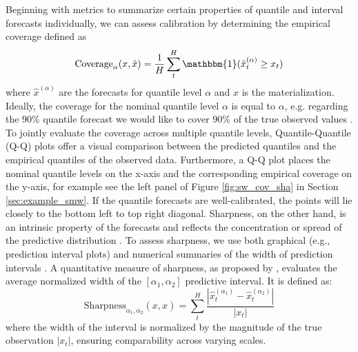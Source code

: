\documentclass[a4paper,oneside,bibliography=totoc]{scrbook}
\begin{document}
\noindent
Beginning with metrics to summarize certain properties of quantile and interval forecasts individually, we can assess calibration by determining the empirical coverage \cite{christoffersen_evaluating_1998, gneiting_probabilistic_2007} defined as 
 \begin{equation}
    \text{Coverage}_\alpha(x,\hat{x}) = \frac{1}{H}\sum_t^H \mathbbm{1}(\hat{x}_t^{(\alpha)} \geq x_t)
    \label{eq:coverage}
\end{equation}
where $\hat{x}^{(\alpha)}$ are the forecasts for quantile level $\alpha$ and $x$ is the materialization.
Ideally, the coverage for the nominal quantile level $\alpha$ is equal to $\alpha$, e.g. regarding the $90\%$ quantile forecast we would like to cover $90\%$ of the true observed values \cite{dheur_large-scale_2023}.
To jointly evaluate the coverage across multiple quantile levels, Quantile-Quantile (Q-Q) plots \cite{wilk_probability_1968, almeida_ggplot2_2018} offer a visual comparison between the predicted quantiles and the empirical quantiles of the observed data. 
Furthermore, a Q-Q plot places the nominal quantile levels on the x-axis and the corresponding empirical coverage on the y-axis, for example see the left panel of Figure \ref{fig:sw_cov_sha} in Section \ref{sec:example_smw}. If the quantile forecasts are well-calibrated, the points will lie closely to the bottom left to top right diagonal.
Sharpness, on the other hand, is an intrinsic property of the forecasts and reflects the concentration or spread of the predictive distribution \cite{tyralis_review_2024}. To assess sharpness, we use both graphical (e.g., prediction interval plots) and numerical summaries of the width of prediction intervals \cite{gneiting_probabilistic_2007}.
A quantitative measure of sharpness, as proposed by \citet{bergsma_c2far_2022}, evaluates the average normalized width of the $[\alpha_1, \alpha_2]$ predictive interval. It is defined as:
 \begin{equation}
    \text{Sharpness}_{\alpha_1, \alpha_2}(x,\hat{x}) = \sum_t^H \frac{|\hat{x}_t^{(\alpha_1)}-\hat{x}_t^{(\alpha_2)}|}{|x_t|}
    \label{eq:sharpness}
\end{equation}
where the width of the interval is normalized by the magnitude of the true observation $|x_t|$, ensuring comparability across varying scales.
\end{document}
